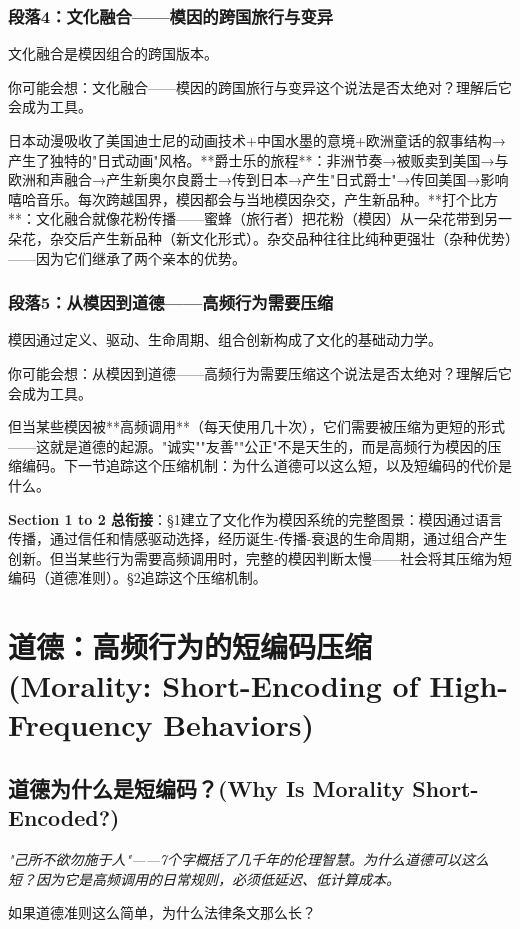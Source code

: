 \documentclass[a4paper,12pt]{book}
\newenvironment{motivation}{\begin{tcolorbox}[colback=gray!10,colframe=gray!60,title=\textit{本章动机},fonttitle=\bfseries,arc=0mm,leftrule=3mm]\small\itshape}{\end{tcolorbox}}
\newenvironment{questionbox}{\begin{tcolorbox}[colback=red!3!white,colframe=red!60!black]}{\end{tcolorbox}}
\begin{document}
\begin{motivation}
\begin{motivation}
\begin{motivation}
	\subsubsection*{段落4：文化融合——模因的跨国旅行与变异}
文化融合是模因组合的跨国版本。
	\begin{tcolorbox}[colback=yellow!5, title=\textit{读者行为预测}]
		你可能会想：文化融合——模因的跨国旅行与变异这个说法是否太绝对？理解后它会成为工具。
	\end{tcolorbox}

日本动漫吸收了美国迪士尼的动画技术+中国水墨的意境+欧洲童话的叙事结构→产生了独特的"日式动画"风格。**爵士乐的旅程**：非洲节奏→被贩卖到美国→与欧洲和声融合→产生新奥尔良爵士→传到日本→产生"日式爵士"→传回美国→影响嘻哈音乐。每次跨越国界，模因都会与当地模因杂交，产生新品种。**打个比方**：文化融合就像花粉传播——蜜蜂（旅行者）把花粉（模因）从一朵花带到另一朵花，杂交后产生新品种（新文化形式）。杂交品种往往比纯种更强壮（杂种优势）——因为它们继承了两个亲本的优势。

	\subsubsection*{段落5：从模因到道德——高频行为需要压缩}
模因通过定义、驱动、生命周期、组合创新构成了文化的基础动力学。
	\begin{tcolorbox}[colback=yellow!5, title=\textit{读者行为预测}]
		你可能会想：从模因到道德——高频行为需要压缩这个说法是否太绝对？理解后它会成为工具。
	\end{tcolorbox}

但当某些模因被**高频调用**（每天使用几十次），它们需要被压缩为更短的形式——这就是道德的起源。"诚实""友善""公正"不是天生的，而是高频行为模因的压缩编码。下一节追踪这个压缩机制：为什么道德可以这么短，以及短编码的代价是什么。

	\textbf{Section 1 to 2 总衔接}：§1建立了文化作为模因系统的完整图景：模因通过语言传播，通过信任和情感驱动选择，经历诞生-传播-衰退的生命周期，通过组合产生创新。但当某些行为需要高频调用时，完整的模因判断太慢——社会将其压缩为短编码（道德准则）。§2追踪这个压缩机制。

	
	\section{道德：高频行为的短编码压缩 (Morality: Short-Encoding of High-Frequency Behaviors)}

	\subsection{道德为什么是短编码？(Why Is Morality Short-Encoded?)}
	\begin{motivation}
		"己所不欲勿施于人"——7个字概括了几千年的伦理智慧。为什么道德可以这么短？因为它是高频调用的日常规则，必须低延迟、低计算成本。
	\end{motivation}
	\begin{questionbox}
		如果道德准则这么简单，为什么法律条文那么长？
	\end{questionbox}


\end{motivation}
\end{motivation}
\end{motivation}
\end{document}
